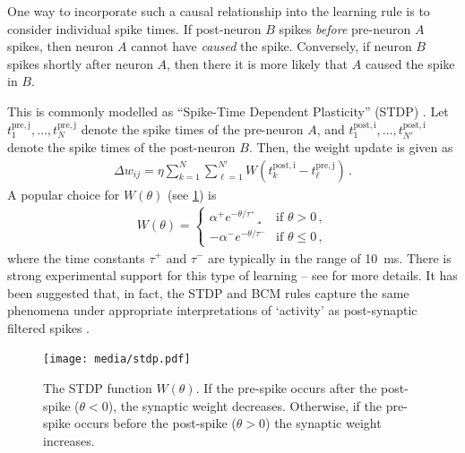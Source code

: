 \documentclass[10pt,letterpaper,oneside]{article}
\begin{document}
One way to incorporate such a causal relationship into the learning rule is to consider individual spike times. If post-neuron $B$ spikes \emph{before} pre-neuron $A$ spikes, then neuron $A$ cannot have \emph{caused} the spike. Conversely, if neuron $B$ spikes shortly after neuron $A$, then there it is more likely that $A$ caused the spike in $B$.

This is commonly modelled as \enquote{Spike-Time Dependent Plasticity} (STDP) \cite{sjostrom2010spiketiming}. Let $t^\mathrm{pre,j}_1, \ldots, t^\mathrm{pre,j}_N$ denote the spike times of the pre-neuron $A$, and $t^\mathrm{post,i}_1, \ldots, t^\mathrm{post,i}_{N'}$ denote the spike times of the post-neuron $B$. Then, the weight update is given as
\begin{align*}
	\Delta w_{ij} = \eta \sum_{k = 1}^N \sum_{\ell = 1}^{N'} W\left(t^\mathrm{post,i}_k - t^\mathrm{pre,j}_\ell\right) \,.
\end{align*}
A popular choice for $W(\theta)$ (see \cref{fig:stdp}) is
\begin{align*}
	W(\theta) = \begin{cases}
		\alpha^+ e^{-\theta / \tau^+}¸& \text{if } \theta > 0 \,,\\
		-\alpha^- e^{-\theta / \tau^-}& \text{if } \theta \leq 0 \,,
	\end{cases}
\end{align*}
where the time constants $\tau^+$ and $\tau^-$ are typically in the range of \SI{10}{\milli\second}. There is strong experimental support for this type of learning -- see \cite{sjostrom2010spiketiming} for more details. It has been suggested that, in fact, the STDP and BCM rules capture the same phenomena under appropriate interpretations of `activity' as post-synaptic filtered spikes \cite{bekolay2011masters}.

\begin{figure}
	\centering
	\texttt{[image: media/stdp.pdf]}
	\caption{The STDP function $W(\theta)$. If the pre-spike occurs after the post-spike ($\theta < 0$), the synaptic weight decreases. Otherwise, if the pre-spike occurs before the post-spike ($\theta > 0$) the synaptic weight increases.}
	\label{fig:stdp}
\end{figure}


\printbibliography
\end{document}
